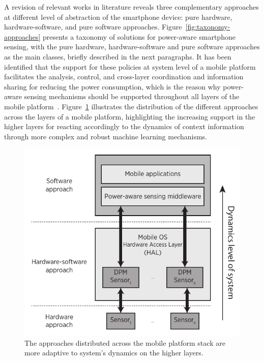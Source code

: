 \documentclass[ENG,PhD]{cinvestav}
\begin{document}
A revision of relevant works in literature reveals three complementary approaches at different level of abstraction of the smartphone device: pure hardware, hardware-software, and pure software approaches.
Figure~\ref{fig:taxonomy-approaches} presents a taxonomy of solutions for power-aware smartphone sensing, with the pure hardware, hardware-software and pure software approaches as the main classes, briefly described in the next paragraphs.
It has been identified that the support for these policies at system level of a mobile platform facilitates the analysis, control, and cross-layer coordination and information sharing for reducing the power consumption, which is the reason why power-aware sensing mechanisms should be supported throughout all layers of the mobile platform~\cite{Ranganathan2010}.
Figure~\ref{fig:distribution-approaches} illustrates the distribution of the different approaches across the layers of a mobile platform, highlighting the increasing support in the higher layers for reacting accordingly to the dynamics of context information through more complex and robust machine learning mechanisms.
\begin{figure}[t]
  \centering
  \includegraphics[width=0.5\columnwidth]{approaches-distribution}
  \caption{The approaches distributed across the mobile platform stack are more adaptive to system's dynamics on the higher layers.}
  \label{fig:distribution-approaches}
\end{figure}
\end{document}
